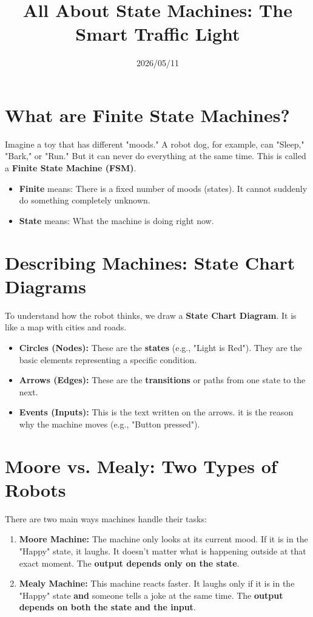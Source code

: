 \documentclass[12pt,a4paper]{article}
\title{All About State Machines: The Smart Traffic Light}
\date{2026/05/11}
\begin{document}
\maketitle

\section{What are Finite State Machines?}
Imagine a toy that has different "moods." A robot dog, for example, can "Sleep," "Bark," or "Run." But it can never do everything at the same time. This is called a \textbf{Finite State Machine (FSM)}.
\begin{itemize}
    \item \textbf{Finite} means: There is a fixed number of moods (states). It cannot suddenly do something completely unknown.
    \item \textbf{State} means: What the machine is doing right now.
\end{itemize}

\section{Describing Machines: State Chart Diagrams}
To understand how the robot thinks, we draw a \textbf{State Chart Diagram}. It is like a map with cities and roads.
\begin{itemize}
    \item \textbf{Circles (Nodes):} These are the \textbf{states} (e.g., "Light is Red"). They are the basic elements representing a specific condition.
    \item \textbf{Arrows (Edges):} These are the \textbf{transitions} or paths from one state to the next.
    \item \textbf{Events (Inputs):} This is the text written on the arrows. it is the reason why the machine moves (e.g., "Button pressed").
\end{itemize}

\section{Moore vs. Mealy: Two Types of Robots}
There are two main ways machines handle their tasks:
\begin{enumerate}
    \item \textbf{Moore Machine:} The machine only looks at its current mood. If it is in the "Happy" state, it laughs. It doesn't matter what is happening outside at that exact moment. The \textbf{output depends only on the state}.
    \item \textbf{Mealy Machine:} This machine reacts faster. It laughs only if it is in the "Happy" state \textbf{and} someone tells a joke at the same time. The \textbf{output depends on both the state and the input}.
\end{enumerate}
\end{document}
